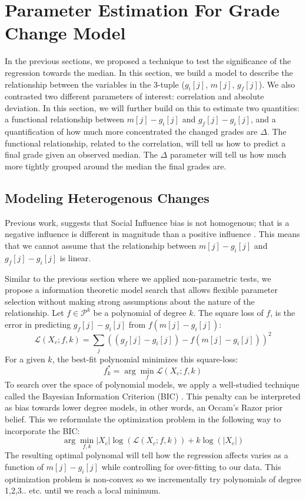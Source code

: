 \section{Parameter Estimation For Grade Change Model}
\label{changemod}
In the previous sections, we proposed a technique to test the significance of the regression towards the median.
In this section, we build a model to describe the relationship between the variables in the 3-tuple ($g_i[j]$, $m[j]$, $g_f[j]$).
We also contrasted two different parameters of interest: correlation and absolute deviation.
In this section, we will further build on this to estimate two quantities: a functional relationship between $m[j] - g_i[j]$ and $g_f[j] - g_i[j]$, and a quantification of how much more concentrated the changed grades are $\Delta$.
The functional relationship, related to the correlation, will tell us how to predict a final grade given an observed median.
The $\Delta$ parameter will tell us how much more tightly grouped around the median the final grades are.

\subsection{Modeling Heterogenous Changes}
Previous work, suggests that Social Influence bias is not homogenous; that is a negative influence is different in magnitude than a positive influence \cite{???}.
This means that we cannot assume that the relationship between $m[j] - g_i[j]$ and $g_f[j] - g_i[j]$ is linear.

Similar to the previous section where we applied non-parametric tests, we propose a information theoretic model search that allows flexible parameter selection without making strong assumptions about the nature of the relationship.
Let $f\in \mathcal{P}^k$ be a polynomial of degree $k$.
The square loss of $f$, is the error in predicting $g_f[j] - g_i[j]$ from $f(m[j] - g_i[j])$:
\begin{equation}
\mathcal{L}(X_c;f,k) = \sum_j ((g_f[j] - g_i[j]) - f(m[j] - g_i[j]))^2 
\end{equation}
For a given $k$, the best-fit polynomial minimizes this square-loss:
\begin{equation}
f^*_k =\arg \min_f \mathcal{L}(X_c;f,k)
\end{equation}
To search over the space of polynomial models, we apply a well-studied technique called the Bayesian Information Criterion (BIC) \cite{???}.
This penalty can be interpreted as bias towards lower degree models, in other words, an Occam's Razor prior belief. 
This we reformulate the optimization problem in the following way to incorporate the BIC:
\begin{equation}
\arg \min_{f,k} |X_c|\log(\mathcal{L}(X_c;f,k)) + k\log(|X_c|)
\end{equation}
The resulting optimal polynomal will tell how the regression affects varies as a function of $m[j] - g_i[j]$ while controlling for over-fitting to our data.
This optimization problem is non-convex so we incrementally try polynomials of degree 1,2,3.. etc. until we reach a local minimum.

